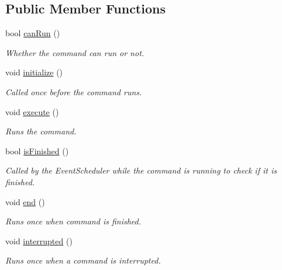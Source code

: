 \subsection*{Public Member Functions}
\begin{DoxyCompactItemize}
\item 
bool \mbox{\hyperlink{class_example_command_ad1df0170d99bcef6c6bc1676551f9539}{can\+Run}} ()
\begin{DoxyCompactList}\small\item\em Whether the command can run or not. \end{DoxyCompactList}\item 
void \mbox{\hyperlink{class_example_command_ae7bea17127c1697acbf90d6022eb5b5d}{initialize}} ()
\begin{DoxyCompactList}\small\item\em Called once before the command runs. \end{DoxyCompactList}\item 
\mbox{\label{class_example_command_af6fead537dd568d80aa3097ca207eda5}} 
void \mbox{\hyperlink{class_example_command_af6fead537dd568d80aa3097ca207eda5}{execute}} ()
\begin{DoxyCompactList}\small\item\em Runs the command. \end{DoxyCompactList}\item 
bool \mbox{\hyperlink{class_example_command_ab4e52d526bda7fe22705b2d3c44286e0}{is\+Finished}} ()
\begin{DoxyCompactList}\small\item\em Called by the Event\+Scheduler while the command is running to check if it is finished. \end{DoxyCompactList}\item 
\mbox{\label{class_example_command_ac3da078fdf1e7a7f94488db815bb0457}} 
void \mbox{\hyperlink{class_example_command_ac3da078fdf1e7a7f94488db815bb0457}{end}} ()
\begin{DoxyCompactList}\small\item\em Runs once when command is finished. \end{DoxyCompactList}\item 
\mbox{\label{class_example_command_ae5a4bb67aa6e6c6234c3dca8eb7ad7ec}} 
void \mbox{\hyperlink{class_example_command_ae5a4bb67aa6e6c6234c3dca8eb7ad7ec}{interrupted}} ()
\begin{DoxyCompactList}\small\item\em Runs once when a command is interrupted. \end{DoxyCompactList}\end{DoxyCompactItemize}
